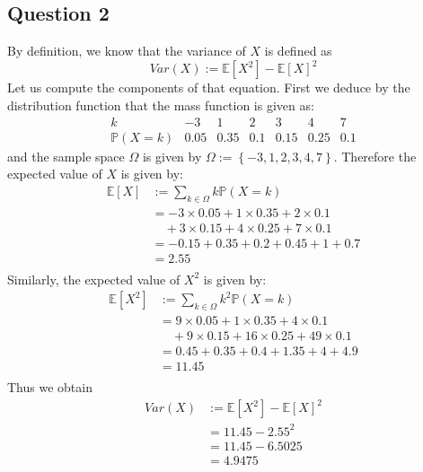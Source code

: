\documentclass{article}
\renewcommand{\P}{\mathbb{P}}
\newcommand{\E}{\mathbb{E}}
\begin{document}
\subsection{Question 2}
By definition, we know that the variance of \(X\) is defined as
\[
    Var(X) := \E[X^2] - \E[X]^2
\]
Let us compute the components of that equation. First we deduce by the distribution function that the mass function is given as:
\[
    \begin{array}{c|c|c|c|c|c|c}
        k       & -3   & 1    & 2   & 3    & 4    & 7   \\
        \hline
        \P(X=k) & 0.05 & 0.35 & 0.1 & 0.15 & 0.25 & 0.1
    \end{array}
\]
and the sample space \(\Omega\) is given by \(\Omega := \left\{ -3, 1, 2, 3, 4, 7 \right\}\). Therefore the expected value of \(X\) is given by:
\begin{align*}
    \E[X]
     & := \sum_{k \in \Omega} k \P(X=k)                     \\
     & = -3 \times 0.05 + 1 \times 0.35 + 2 \times 0.1      \\
     & \quad + 3 \times 0.15 + 4 \times 0.25 + 7 \times 0.1 \\
     & = -0.15 + 0.35 + 0.2 + 0.45 + 1 + 0.7                \\
     & = 2.55                                               \\
\end{align*}
Similarly, the expected value of \(X^2\) is given by:
\begin{align*}
    \E[X^2]
     & := \sum_{k \in \Omega} k^2 \P(X=k)                     \\
     & = 9 \times 0.05 + 1 \times 0.35 + 4 \times 0.1         \\
     & \quad + 9 \times 0.15 + 16 \times 0.25 + 49 \times 0.1 \\
     & = 0.45 + 0.35 + 0.4 + 1.35 + 4 + 4.9                   \\
     & = 11.45                                                \\
\end{align*}
Thus we obtain
\begin{align*}
    Var(X)
     & := \E[X^2] - \E[X]^2 \\
     & = 11.45 - 2.55^2     \\
     & = 11.45 - 6.5025     \\
     & = 4.9475
\end{align*}
\end{document}

